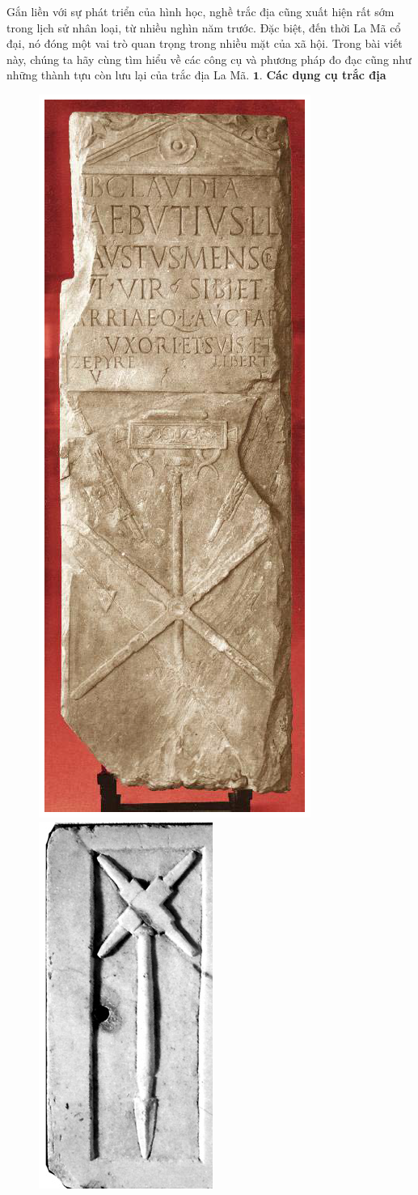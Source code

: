 \vspace*{185pt}
\begin{multicols}{2}
	Gắn liền với sự phát triển của hình học, nghề trắc địa cũng xuất hiện rất sớm trong lịch sử nhân loại, từ nhiều nghìn năm trước. Đặc biệt, đến thời La Mã cổ đại, nó đóng một vai trò quan trọng trong nhiều mặt của xã hội. Trong bài viết này, chúng ta hãy cùng tìm hiểu về các công cụ và phương pháp đo đạc cũng như những thành tựu còn lưu lại của trắc địa La Mã.
	\vskip 0.1cm
	$\pmb{1.}$ \textbf{\color{toanhocdoisong}Các dụng cụ trắc địa}
	\begin{figure}[H]
		\vspace*{-5pt}
		\centering
		\captionsetup{labelformat= empty, justification=centering}
		\includegraphics[height=0.8\linewidth]{1a}
		\includegraphics[height=0.8\linewidth]{1b}

\end{figure}
\end{multicols}
